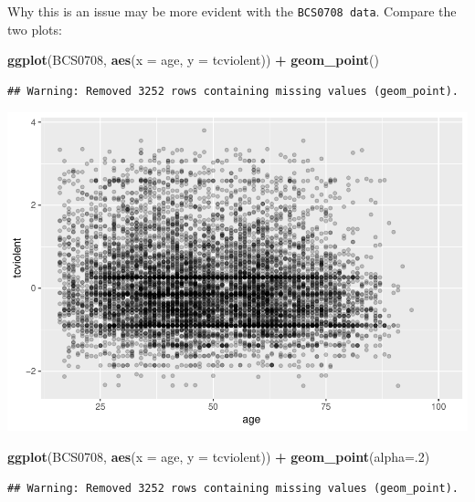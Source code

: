 \documentclass[]{book}
\newenvironment{Shaded}{\begin{snugshade}}{\end{snugshade}}
\newcommand{\DataTypeTok}[1]{\textcolor[rgb]{0.13,0.29,0.53}{#1}}
\newcommand{\DecValTok}[1]{\textcolor[rgb]{0.00,0.00,0.81}{#1}}
\newcommand{\KeywordTok}[1]{\textcolor[rgb]{0.13,0.29,0.53}{\textbf{#1}}}
\newcommand{\NormalTok}[1]{#1}
\newcommand{\OperatorTok}[1]{\textcolor[rgb]{0.81,0.36,0.00}{\textbf{#1}}}
\newcommand{\StringTok}[1]{\textcolor[rgb]{0.31,0.60,0.02}{#1}}
\theoremstyle{definition}
\theoremstyle{definition}
\theoremstyle{definition}
\theoremstyle{remark}
\begin{document}
Why this is an issue may be more evident with the
\texttt{BCS0708\ data}. Compare the two plots:

\begin{Shaded}
\begin{Highlighting}[]
\KeywordTok{ggplot}\NormalTok{(BCS0708, }\KeywordTok{aes}\NormalTok{(}\DataTypeTok{x =}\NormalTok{ age, }\DataTypeTok{y =}\NormalTok{ tcviolent)) }\OperatorTok{+}
\StringTok{  }\KeywordTok{geom_point}\NormalTok{()}
\end{Highlighting}
\end{Shaded}

\begin{verbatim}
## Warning: Removed 3252 rows containing missing values (geom_point).
\end{verbatim}

\includegraphics{03-visualisation_files/figure-latex/unnamed-chunk-37-1.pdf}

\begin{Shaded}
\begin{Highlighting}[]
\KeywordTok{ggplot}\NormalTok{(BCS0708, }\KeywordTok{aes}\NormalTok{(}\DataTypeTok{x =}\NormalTok{ age, }\DataTypeTok{y =}\NormalTok{ tcviolent)) }\OperatorTok{+}
\StringTok{  }\KeywordTok{geom_point}\NormalTok{(}\DataTypeTok{alpha=}\NormalTok{.}\DecValTok{2}\NormalTok{)}
\end{Highlighting}
\end{Shaded}

\begin{verbatim}
## Warning: Removed 3252 rows containing missing values (geom_point).
\end{verbatim}
\end{document}
